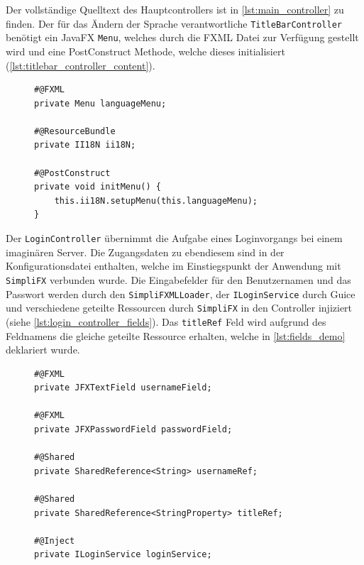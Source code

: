 \noindent Der vollständige Quelltext des Hauptcontrollers ist in \autoref{lst:main_controller} zu finden.
\noindent Der für das Ändern der Sprache verantwortliche \texttt{TitleBarController} benötigt ein JavaFX \texttt{Menu}, welches durch die FXML Datei zur Verfügung gestellt wird und eine PostConstruct Methode, welche dieses initialisiert (\autoref{lst:titlebar_controller_content}).
\begin{figure}[H]
	\begin{lstlisting}[caption=Demo -- Felder und Methoden im \texttt{TitleBarController}, captionpos=b, label=lst:titlebar_controller_content]
#@FXML
private Menu languageMenu;

#@ResourceBundle
private II18N ii18N;

#@PostConstruct
private void initMenu() {
    this.ii18N.setupMenu(this.languageMenu);
}
	\end{lstlisting}
\end{figure}
\noindent Der \texttt{LoginController} übernimmt die Aufgabe eines Loginvorgangs bei einem imaginären Server. Die Zugangsdaten zu ebendiesem sind in der Konfigurationsdatei enthalten, welche im Einstiegspunkt der Anwendung mit \texttt{SimpliFX} verbunden wurde. Die Eingabefelder für den Benutzernamen und das Passwort werden durch den \texttt{SimpliFXMLLoader}, der \texttt{ILoginService} durch Guice und verschiedene geteilte Ressourcen durch \texttt{SimpliFX} in den Controller injiziert (siehe \autoref{lst:login_controller_fields}). Das \texttt{titleRef} Feld wird aufgrund des Feldnamens die gleiche geteilte Ressource erhalten, welche in \autoref{lst:fields_demo} deklariert wurde.
\begin{figure}[H]
	\begin{lstlisting}[caption=Demo -- Injizierte Felder des \texttt{LoginController}s, captionpos=b, label=lst:login_controller_fields]
#@FXML
private JFXTextField usernameField;

#@FXML
private JFXPasswordField passwordField;

#@Shared
private SharedReference<String> usernameRef;

#@Shared
private SharedReference<StringProperty> titleRef;

#@Inject
private ILoginService loginService;
	\end{lstlisting}
\end{figure}

